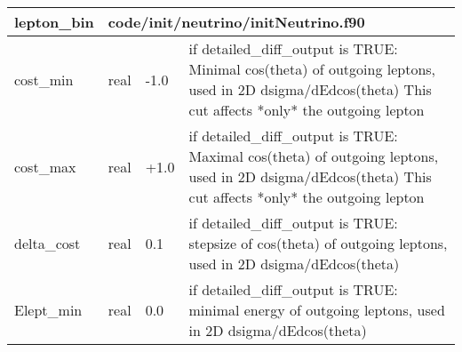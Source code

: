 \documentclass{article}
\begin{document}
{ }




\begin{longtable}{llll}
\toprule
\textbf{\large{lepton\_bin}} & \multicolumn{3}{l}{\footnotesize{code/init/neutrino/initNeutrino.f90}}\\*
\midrule
\endfirsthead
\midrule
\endhead
cost\_min & \begin{minipage}[t]{2cm}real\end{minipage} & \begin{minipage}[t]{2cm}-1.0\end{minipage} & \begin{minipage}[t]{12cm}if detailed\_diff\_output is TRUE: Minimal cos(theta) of outgoing leptons, used in 2D dsigma/dEdcos(theta) This cut affects *only* the outgoing lepton\end{minipage}\\*
\midrule
cost\_max & \begin{minipage}[t]{2cm}real\end{minipage} & \begin{minipage}[t]{2cm}+1.0\end{minipage} & \begin{minipage}[t]{12cm}if detailed\_diff\_output is TRUE: Maximal cos(theta) of outgoing leptons, used in 2D dsigma/dEdcos(theta) This cut affects *only* the outgoing lepton\end{minipage}\\*
\midrule
delta\_cost & \begin{minipage}[t]{2cm}real\end{minipage} & \begin{minipage}[t]{2cm}0.1\end{minipage} & \begin{minipage}[t]{12cm}if detailed\_diff\_output is TRUE: stepsize of cos(theta) of outgoing leptons, used in 2D dsigma/dEdcos(theta)\end{minipage}\\*
\midrule
Elept\_min & \begin{minipage}[t]{2cm}real\end{minipage} & \begin{minipage}[t]{2cm}0.0\end{minipage} & \begin{minipage}[t]{12cm}if detailed\_diff\_output is TRUE: minimal energy of outgoing leptons, used in 2D dsigma/dEdcos(theta)\end{minipage}\\*

\end{longtable}
\end{document}

